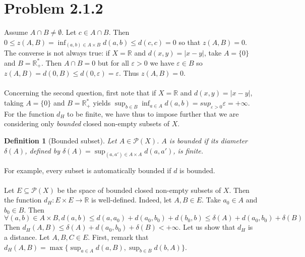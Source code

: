\documentclass[11pt,a4paper]{article}
\newtheorem{defi}{Definition}
\newcommand{\il}{\textit}
\newcommand{\R}{\mathbb{R}}
\newcommand{\1}{\mathbbm{1}}
\renewcommand{\P}{\mathcal{P}}
\begin{document}
\section*{Problem 2.1.2}

Assume $A \cap B \neq \emptyset$. Let $c \in A \cap B$. Then $0 \leq z(A,B) = \inf_{(a,b) \in A \times B} d(a,b) \leq d(c,c) = 0$ so that $z(A,B) = 0$. The converse is not always true: if $X = \R$ and $d(x,y) = |x-y|$, take $A = \{0\}$ and $B = \R_+^*$. Then $A \cap B = 0$ but for all $\varepsilon > 0$ we have $\varepsilon \in B$ so $z(A,B) = d(0,B) \leq d(0,\varepsilon) = \varepsilon$. Thus $z(A,B) = 0$.\\\\
Concerning the second question, first note that if $X = \R$ and $d(x,y) = |x-y|$, taking $A = \{0\}$ and $B = \R_+^*$ yields $\sup_{b \in B} \inf_{a\in A} d(a,b) = sup_{\varepsilon > 0} \varepsilon = +\infty$. For the function $d_H$ to be finite, we have thus to impose further that we are considering only \il{bounded} closed non-empty subsets of $X$. 
\begin{defi}[Bounded subset] Let $A \in \P(X)$. $A$ is bounded if its diameter $\delta(A)$, defined by $\delta(A) = \sup_{(a,a') \in A \times A} d(a,a')$, is finite.
\end{defi}
For example, every subset is automatically bounded if $d$ is bounded.\\\\
Let $E \subseteq \P(X)$ be the space of bounded closed non-empty subsets of $X$. Then the function $d_H : E \times E \to \R$ is well-defined. Indeed, let $A,B \in E$. Take $a_0 \in A$ and $b_0 \in B$. Then
\[ \forall (a,b) \in A \times B,  d(a,b) \leq d(a,a_0) +  d(a_0,b_0) + d(b_0,b) \leq \delta(A) + d(a_0,b_0) + \delta(B) \]
Then $d_H(A,B) \leq \delta(A) + d(a_0,b_0) + \delta(B) < +\infty$. Let us show that $d_H$ is a distance.
Let $A,B,C \in E$. First, remark that $d_H(A,B) = \max\{ \sup_{a \in A} d(a,B) , \sup_{b \in B} d(b,A) \}$.
\end{document}
